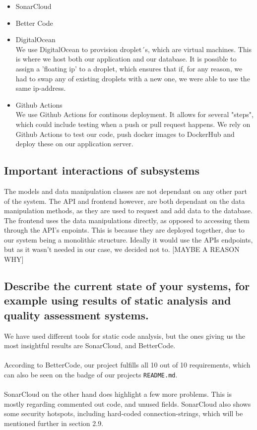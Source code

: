 \documentclass{article}
\begin{document}
\begin{itemize}
 	\item SonarCloud\\
 	\item Better Code\\
 	\item DigitalOcean\\
 	We use DigitalOcean to provision droplet´s, which are virtual machines. This is where we host both our application and our database. It is possible to assign a 'floating ip' to a droplet, which ensures that if, for any reason, we had to swap any of existing droplets with a new one, we were able to use the same ip-address.
 	\item Github Actions\\
 	We use Github Actions for continous deployment. It allows for several "steps", which could include testing when a push or pull request happens. We rely on Github Actions to test our code, push docker images to DockerHub and deploy these on our application server.
 	
 	
\end{itemize}

\subsection{Important interactions of subsystems}
The models and data manipulation classes are not dependant on any other part of the system. The API and frontend however, are both dependant on the data manipulation methods, as they are used to request and add data to the database. The frontend uses the data manipulations directly, as opposed to accessing them through the API's enpoints. This is because they are deployed together, due to our system being a monolithic structure. Ideally it would use the APIs endpoints, but as it wasn't needed in our case, we decided not to. [MAYBE A REASON WHY]

\subsection{Describe the current state of your systems, for example using results of static analysis and quality assessment systems.}
We have used different tools for static code analysis, but the ones giving us the most insightful results are SonarCloud, and BetterCode.
\\\\
According to BetterCode, our project fulfills all 10 out of 10 requirements, which can also be seen on the badge of our projects \verb|README.md|.
\\\\
SonarCloud on the other hand does highlight a few more problems. This is mostly regarding commented out code, and unused fields. SonarCloud also shows some security hotspots, including hard-coded connection-strings, which will be mentioned further in section 2.9.
\end{document}
